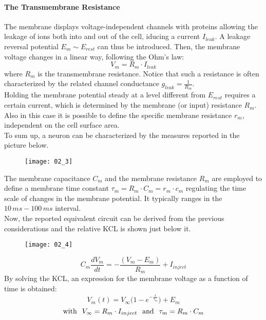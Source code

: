 \paragraph{The Transmembrane Resistance}
The membrane displays voltage-independent channels with proteins allowing the leakage of ions
both into and out of the cell, iducing a current \(I_{leak}\). A leakage reversal potential
\(E_{m}\sim{E_{rest}}\) can thus be introduced. Then, the membrane voltage changes in a linear way,
following the Ohm's law:
\begin{equation*}
    V_{m}=R_{m}\cdot{I_{leak}}
\end{equation*}
where \(R_{m}\) is the transmembrane resistance. Notice that such a resistance is often
characterized by the related channel conductance \(g_{leak}=\frac{1}{R_{m}}\).\\
Holding the membrane potential steady at a level different from \(E_{rest}\) requires a certain
current, which is determined by the membrane (or input) resistance \(R_{m}\). Also in this
case it is possible to define the specific membrane resistance \(r_{m}\), independent on the
cell surface area.\\
\newline
To sum up, a neuron can be characterized by the measures reported in the picture below.
\begin{figure}[H]
    \texttt{[image: 02\_3]}
    \centering
\end{figure}
The membrane capacitance \(C_{m}\) and the membrane resistance \(R_{m}\) are employed to define
a membrane time constant \(\tau_{m}=R_{m}\cdot{C_{m}}=r_{m}\cdot{c_{m}}\) regulating the time
scale of changes in the membrane potential. It typically ranges in the \(10\,ms-100\,ms\) interval.\\
Now, the reported equivalent circuit can be derived from the previous considerations and the
relative KCL is shown just below it.
\begin{figure}[H]
    \texttt{[image: 02\_4]}
    \centering
\end{figure}
\begin{equation*}
    C_{m}\frac{dV_{m}}{dt}=-\frac{(V_{m}-E_{m})}{R_{m}}+I_{inject}
\end{equation*}
By solving the KCL, an expression for the membrane voltage as a function of time is obtained:
\begin{equation*}
    V_{m}(t)=V_{\infty}\bigl(1-e^{-\frac{t}{\tau_{m}}}\bigr)+E_{m}
\end{equation*}
\begin{equation*}
    \text{with}
    \hspace{0.25cm}
    V_{\infty}=R_{m}\cdot{I_{inject}}
    \hspace{0.25cm}
    \text{and}
    \hspace{0.25cm}
    \tau_{m}=R_{m}\cdot{C_{m}}
\end{equation*}
